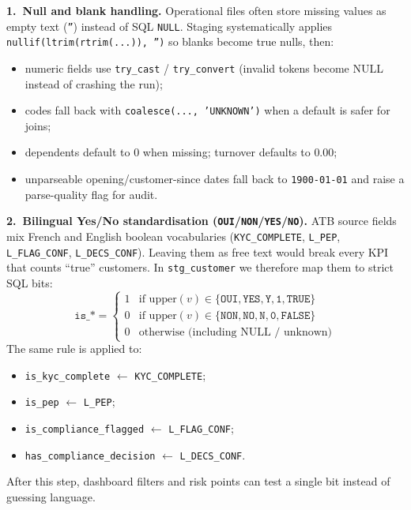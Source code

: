 \textbf{1.\ Null and blank handling.}
Operational files often store missing values as empty text (\texttt{''}) instead
of SQL \texttt{NULL}. Staging systematically applies
\texttt{nullif(ltrim(rtrim(...)), '')} so blanks become true nulls, then:
\begin{itemize}
    \item numeric fields use \texttt{try\_cast} / \texttt{try\_convert} (invalid
          tokens become NULL instead of crashing the run);
    \item codes fall back with \texttt{coalesce(..., 'UNKNOWN')} when a default is
          safer for joins;
    \item dependents default to $0$ when missing; turnover defaults to $0.00$;
    \item unparseable opening/customer-since dates fall back to
          \texttt{1900-01-01} and raise a parse-quality flag for audit.
\end{itemize}

\textbf{2.\ Bilingual Yes/No standardisation (\texttt{OUI}/\texttt{NON}/\texttt{YES}/\texttt{NO}).}
ATB source fields mix French and English boolean vocabularies
(\texttt{KYC\_COMPLETE}, \texttt{L\_PEP}, \texttt{L\_FLAG\_CONF},
\texttt{L\_DECS\_CONF}). Leaving them as free text would break every KPI that
counts ``true'' customers. In \texttt{stg\_customer} we therefore map them to
strict SQL bits:
\begin{equation}
\texttt{is\_*} =
\begin{cases}
1 & \text{if }\mathrm{upper}(v)\in\{\texttt{OUI},\texttt{YES},\texttt{Y},\texttt{1},\texttt{TRUE}\}\\
0 & \text{if }\mathrm{upper}(v)\in\{\texttt{NON},\texttt{NO},\texttt{N},\texttt{0},\texttt{FALSE}\}\\
0 & \text{otherwise (including NULL / unknown)}
\end{cases}
\end{equation}
The same rule is applied to:
\begin{itemize}
    \item \texttt{is\_kyc\_complete} $\leftarrow$ \texttt{KYC\_COMPLETE};
    \item \texttt{is\_pep} $\leftarrow$ \texttt{L\_PEP};
    \item \texttt{is\_compliance\_flagged} $\leftarrow$ \texttt{L\_FLAG\_CONF};
    \item \texttt{has\_compliance\_decision} $\leftarrow$ \texttt{L\_DECS\_CONF}.
\end{itemize}
After this step, dashboard filters and risk points can test a single bit instead
of guessing language.

